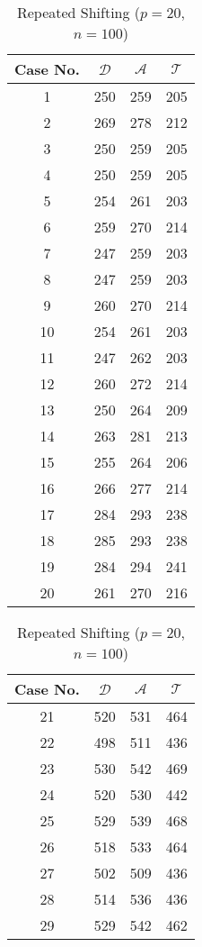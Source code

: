 
\begin{table}[!htb]
\parbox{.45\linewidth}{
\centering
\begin{tabular}{|c|c|c|c|}
\hline
Case No. & $\mathcal{D}$ & $\mathcal{A}$ & $\mathcal{T}$ \\
\hline
1   & 250   & 259   & 205   \\
2   & 269   & 278   & 212   \\
3   & 250   & 259   & 205   \\
4   & 250   & 259   & 205   \\
5   & 254   & 261   & 203   \\
6   & 259   & 270   & 214   \\
7   & 247   & 259   & 203   \\
8   & 247   & 259   & 203   \\
9   & 260   & 270   & 214   \\
10  & 254   & 261   & 203   \\
11  & 247   & 262   & 203   \\
12  & 260   & 272   & 214   \\
13  & 250   & 264   & 209   \\
14  & 263   & 281   & 213   \\
15  & 255   & 264   & 206   \\
16  & 266   & 277   & 214   \\
17  & 284   & 293   & 238   \\
18  & 285   & 293   & 238   \\
19  & 284   & 294   & 241   \\
20  & 261   & 270   & 216   \\
\hline
\end{tabular}
\caption{Repeated Shifting ($p=20$, $n=100$)}
\label{tab:dat-20}
}
\hfill
\parbox{.45\linewidth}{
\centering
\begin{tabular}{|c|c|c|c|}
\hline
Case No. & $\mathcal{D}$ & $\mathcal{A}$ & $\mathcal{T}$ \\
\hline
21 & 520 & 531 & 464 \\
22 & 498 & 511 & 436 \\
23 & 530 & 542 & 469 \\
24 & 520 & 530 & 442 \\
25 & 529 & 539 & 468 \\
26 & 518 & 533 & 464 \\
27 & 502 & 509 & 436 \\
28 & 514 & 536 & 436 \\
29 & 529 & 542 & 462 \\

\end{tabular}}
\end{table}
